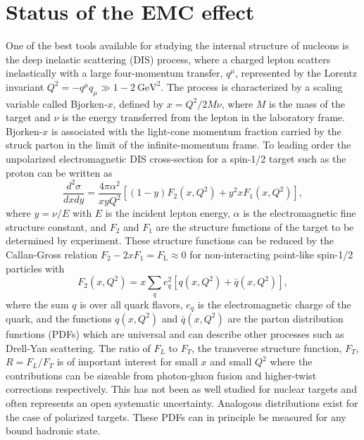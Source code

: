 \section{Status of the EMC effect\label{sec:status}}
%
One of the best tools available for studying the internal structure of nucleons is the deep inelastic
scattering (DIS) process, where a charged lepton scatters inelastically with a large four-momentum
transfer, $q^\mu$, represented by the Lorentz invariant $Q^2 = -q^\mu q_\mu \gg 1-2~\mathrm{GeV}^2$.
The process is characterized by a scaling variable called Bjorken-$x$, defined by $x = Q^2/2M \nu$, 
where $M$ is the mass of the target and $\nu$ is the energy transferred from the lepton in the laboratory frame. Bjorken-$x$ is associated with the light-cone momentum fraction carried by the struck parton in the limit of the infinite-momentum frame. To leading order the unpolarized electromagnetic DIS cross-section for a spin-1/2 target such as the proton can be written as~\cite{PhysRevD.98.030001}
%
\begin{equation}
\frac{d^2 \sigma}{dx dy} = \frac{4 \pi \alpha^2}{x y Q^2} \left[ (1-y)F_2(x, Q^2) + y^2 x F_1(x, Q^2) \right],
\end{equation}
%
where $y = \nu/E$ with $E$ is the incident lepton energy, $\alpha$ is the electromagnetic fine structure constant, and $F_2$
and $F_1$ are the structure functions of the target to be determined by experiment. These structure functions can be reduced by the Callan-Gross relation $F_2 - 2xF_1 = F_\mathrm{L} \approx 0$ for non-interacting point-like spin-1/2 particles with
%
\begin{equation}
F_2(x,Q^2) = x \sum_{q} e_q^2 \left[q(x,Q^2) + \bar{q}(x,Q^2)\right],
\end{equation}
where the sum $q$ is over all quark flavors,  $e_q$ is the electromagnetic charge of the quark, and the
functions $q(x,Q^2)$ and $\bar{q}(x,Q^2)$ are the parton distribution functions (PDFs) which are universal and can describe other processes such as Drell-Yan scattering.  The ratio of $F_L$ to $F_T$, the transverse structure function, $F_T$,  $R = F_L/F_T$ is of important interest for small $x$ and small $Q^2$ where the contributions can be sizeable from photon-gluon fusion and higher-twist corrections respectively.  This has not been as well studied for nuclear targets and often represents an open systematic uncertainty.  Analogous distributions exist for the case of polarized targets. These PDFs can in principle be measured for any bound hadronic state.

